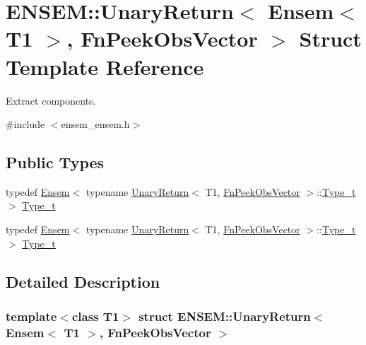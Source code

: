\hypertarget{structENSEM_1_1UnaryReturn_3_01Ensem_3_01T1_01_4_00_01FnPeekObsVector_01_4}{}\section{E\+N\+S\+EM\+:\+:Unary\+Return$<$ Ensem$<$ T1 $>$, Fn\+Peek\+Obs\+Vector $>$ Struct Template Reference}
\label{structENSEM_1_1UnaryReturn_3_01Ensem_3_01T1_01_4_00_01FnPeekObsVector_01_4}


Extract components.  




{\ttfamily \#include $<$ensem\+\_\+ensem.\+h$>$}

\subsection*{Public Types}
\begin{DoxyCompactItemize}
\item 
typedef \mbox{\hyperlink{classENSEM_1_1Ensem}{Ensem}}$<$ typename \mbox{\hyperlink{structENSEM_1_1UnaryReturn}{Unary\+Return}}$<$ T1, \mbox{\hyperlink{structENSEM_1_1FnPeekObsVector}{Fn\+Peek\+Obs\+Vector}} $>$\+::\mbox{\hyperlink{structENSEM_1_1UnaryReturn_3_01Ensem_3_01T1_01_4_00_01FnPeekObsVector_01_4_a1dc591fee09e0be58d290f5f4062e2d7}{Type\+\_\+t}} $>$ \mbox{\hyperlink{structENSEM_1_1UnaryReturn_3_01Ensem_3_01T1_01_4_00_01FnPeekObsVector_01_4_a1dc591fee09e0be58d290f5f4062e2d7}{Type\+\_\+t}}
\item 
typedef \mbox{\hyperlink{classENSEM_1_1Ensem}{Ensem}}$<$ typename \mbox{\hyperlink{structENSEM_1_1UnaryReturn}{Unary\+Return}}$<$ T1, \mbox{\hyperlink{structENSEM_1_1FnPeekObsVector}{Fn\+Peek\+Obs\+Vector}} $>$\+::\mbox{\hyperlink{structENSEM_1_1UnaryReturn_3_01Ensem_3_01T1_01_4_00_01FnPeekObsVector_01_4_a1dc591fee09e0be58d290f5f4062e2d7}{Type\+\_\+t}} $>$ \mbox{\hyperlink{structENSEM_1_1UnaryReturn_3_01Ensem_3_01T1_01_4_00_01FnPeekObsVector_01_4_a1dc591fee09e0be58d290f5f4062e2d7}{Type\+\_\+t}}
\end{DoxyCompactItemize}


\subsection{Detailed Description}
\subsubsection*{template$<$class T1$>$\newline
struct E\+N\+S\+E\+M\+::\+Unary\+Return$<$ Ensem$<$ T1 $>$, Fn\+Peek\+Obs\+Vector $>$}


